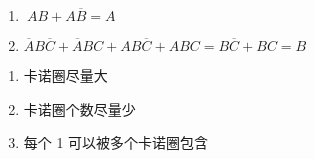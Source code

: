 \begin{enumerate}
          \begin{enumerate}
              \item $~AB+A\overline{B}=A$
              \item $\overline{A}B\overline{C}+\overline{A}BC+AB\overline{C}+ABC=B\overline{C}+BC=B$
          \end{enumerate}

          \begin{enumerate}

              \item 卡诺圈尽量大
              \item 卡诺圈个数尽量少
              \item 每个 1 可以被多个卡诺圈包含

          \end{enumerate}

\end{enumerate}

\newpage

